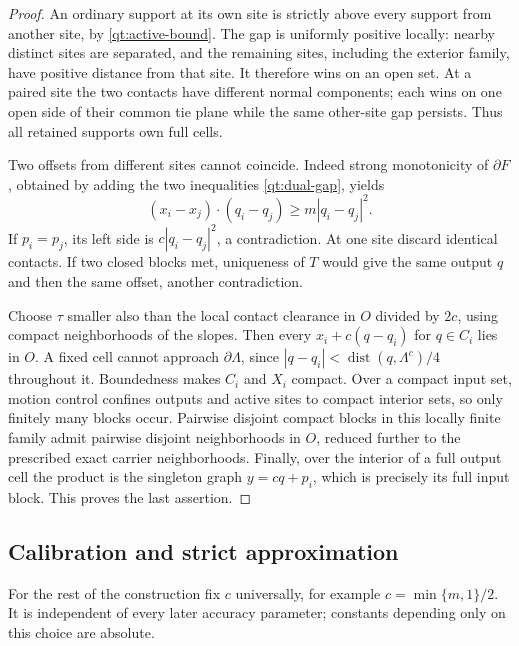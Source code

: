 \documentclass[11pt]{article}
\numberwithin{equation}{section}
\theoremstyle{definition}
\theoremstyle{remark}
\DeclareMathOperator{\dist}{dist}
\begin{document}
\begin{proof}
An ordinary support at its own site is strictly above every support
from another site, by \eqref{qt:active-bound}.  The gap is uniformly
positive locally: nearby distinct sites are separated, and the
remaining sites, including the exterior family, have positive distance
from that site.  It therefore wins on an open set.  At a paired site
the two contacts have different normal components; each wins on one
open side of their common tie plane while the same other-site gap
persists.  Thus all retained supports own full cells.

Two offsets from different sites cannot coincide.  Indeed strong
monotonicity of $\partial F$, obtained by adding the two inequalities
\eqref{qt:dual-gap}, yields
\[
 (x_i-x_j)\cdot(q_i-q_j)\geq m|q_i-q_j|^2.
\]
If $p_i=p_j$, its left side is $c|q_i-q_j|^2$, a contradiction.
At one site discard identical contacts.  If two closed blocks met,
uniqueness of $T$ would give the same output $q$ and then the same
offset, another contradiction.

Choose $\tau$ smaller also than the local contact clearance in $O$
divided by $2c$, using compact neighborhoods of the slopes.
Then every $x_i+c(q-q_i)$ for $q\in C_i$ lies in $O$.  A fixed cell
cannot approach $\partial\Lambda$, since
$|q-q_i|<\dist(q,\Lambda^c)/4$ throughout it.  Boundedness makes $C_i$
and $X_i$ compact.  Over a compact input set, motion control confines
outputs and active sites to compact interior sets, so only finitely
many blocks occur.  Pairwise disjoint compact blocks in this locally
finite family admit pairwise disjoint neighborhoods in $O$, reduced
further to the prescribed exact carrier neighborhoods.  Finally, over
the interior of a full output cell the product is the singleton graph
$y=cq+p_i$, which is precisely its full input block.  This proves the
last assertion.
\end{proof}

\subsection{Calibration and strict approximation}

For the rest of the construction fix $c$ universally, for example
$c=\min\{m,1\}/2$.  It is independent of every later accuracy
parameter; constants depending only on this choice are absolute.
\end{document}
